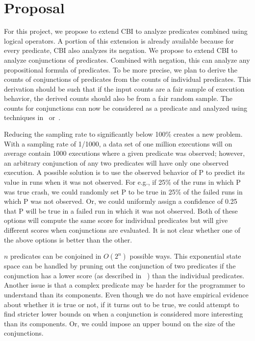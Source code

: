 \section{Proposal}
For this project, we propose to extend CBI to analyze predicates combined using logical operators.  A portion of this extension is already available because for every predicate, CBI also analyzes its negation.  We propose to extend CBI to analyze conjunctions of predicates.  Combined with negation, this can analyze any propositional formula of predicates.  To be more precise, we plan to derive the counts of conjunctions of predicates from the counts of individual predicates.  This derivation should be such that if the input counts are a fair sample of execution behavior, the derived counts should also be from a fair random sample.  The counts for conjunctions can now be considered as a predicate and analyzed using techniques in~\cite{Liblit:2005:SSBI} or~\cite{Zheng:2006:SDSIMB}.

Reducing the sampling rate to significantly below 100\% creates a new problem. With a sampling rate of 1/1000, a data set of one million executions will on average contain 1000 executions where a given predicate was observed; however, an arbitrary conjunction of any two predicates will have only one observed execution.  A possible solution is to use the observed behavior of P to predict its value in runs when it was not observed.  For e.g., if 25\% of the runs in which P was true crash, we could randomly set P to be true in 25\% of the failed runs in which P was not observed.  Or, we could uniformly assign a confidence of 0.25 that P will be true in a failed run in which it was not observed.  Both of these options will compute the same score for individual predicates but will give different scores when conjunctions are evaluated.  It is not clear whether one of the above options is better than the other.

$n$ predicates can be conjoined in $O(2^n)$ possible ways.  This exponential state space can be handled by pruning out the conjunction of two predicates if the conjunction has a lower score (as described in ~\cite{Liblit:2005:SSBI}) than the individual predicates.  Another issue is that a complex predicate may be harder for the programmer to understand than its components.  Even though we do not have empirical evidence about whether it is true or not, if it turns out to be true, we could attempt to find stricter lower bounds on when a conjunction is considered more interesting than its components.  Or, we could impose an upper bound on the size of the conjunctions.


